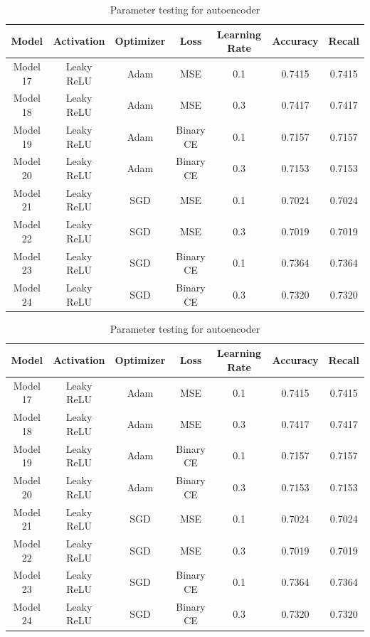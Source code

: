 \begin{table}[H]
    \centering
    \begin{tabular}{|c|c|c|c|c|c|c|}
        \hline
        \rowcolor{lightgreen}
        \textbf{Model} & \textbf{Activation} & \textbf{Optimizer} & \textbf{Loss} & \textbf{Learning Rate} & \textbf{Accuracy} & \textbf{Recall} \\
        \hline
        Model 17 & Leaky ReLU & Adam & MSE & 0.1 & 0.7415 & 0.7415 \\
        \hline
        Model 18 & Leaky ReLU & Adam & MSE & 0.3 & 0.7417 & 0.7417 \\
        \hline
        Model 19 & Leaky ReLU & Adam & Binary CE & 0.1 & 0.7157 & 0.7157 \\
        \hline
        Model 20 & Leaky ReLU & Adam & Binary CE & 0.3 & 0.7153 & 0.7153 \\
        \hline
        Model 21 & Leaky ReLU & SGD & MSE & 0.1 & 0.7024 & 0.7024 \\
        \hline
        Model 22 & Leaky ReLU & SGD & MSE & 0.3 & 0.7019 & 0.7019 \\
        \hline
        Model 23 & Leaky ReLU & SGD & Binary CE & 0.1 & 0.7364 & 0.7364 \\
        \hline
        Model 24 & Leaky ReLU & SGD & Binary CE & 0.3 & 0.7320 & 0.7320 \\
        \hline
    \end{tabular}
    \caption{Parameter testing for autoencoder}
    \label{tab:op3}
\end{table}
\begin{table}[H]
    \centering
    \begin{tabular}{|c|c|c|c|c|c|c|}
        \hline
        \rowcolor{lightgreen}
        \textbf{Model} & \textbf{Activation} & \textbf{Optimizer} & \textbf{Loss} & \textbf{Learning Rate} & \textbf{Accuracy} & \textbf{Recall} \\
        \hline
        Model 17 & Leaky ReLU & Adam & MSE & 0.1 & 0.7415 & 0.7415 \\
        \hline
        Model 18 & Leaky ReLU & Adam & MSE & 0.3 & 0.7417 & 0.7417 \\
        \hline
        Model 19 & Leaky ReLU & Adam & Binary CE & 0.1 & 0.7157 & 0.7157 \\
        \hline
        Model 20 & Leaky ReLU & Adam & Binary CE & 0.3 & 0.7153 & 0.7153 \\
        \hline
        Model 21 & Leaky ReLU & SGD & MSE & 0.1 & 0.7024 & 0.7024 \\
        \hline
        Model 22 & Leaky ReLU & SGD & MSE & 0.3 & 0.7019 & 0.7019 \\
        \hline
        Model 23 & Leaky ReLU & SGD & Binary CE & 0.1 & 0.7364 & 0.7364 \\
        \hline
        Model 24 & Leaky ReLU & SGD & Binary CE & 0.3 & 0.7320 & 0.7320 \\
        \hline
    \end{tabular}
    \caption{Parameter testing for autoencoder}
    \label{tab:op4}
\end{table}





